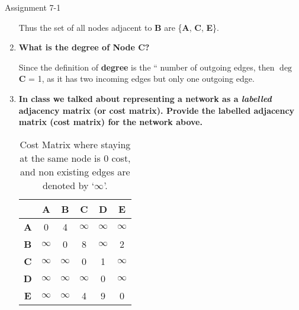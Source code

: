\documentclass{beamer}
\begin{document}
\begin{frame}[allowframebreaks]{Assignment 7-1}
\begin{enumerate}
\begin{solution}
			Thus the set of all nodes adjacent to \textbf{B} are \{\textbf{A}, \textbf{C}, \textbf{E}\}.
		\end{solution}
		\item {\bf What is the degree of Node C?}
		\begin{solution}
			Since the definition of \textbf{degree} is the `` number of outgoing edges, then $\deg$ \textbf{C} = 1, as it has two incoming edges but only one outgoing edge.
		\end{solution}
		\item {\bf In class we talked about representing a network as a \emph{labelled} adjacency matrix (or cost matrix). Provide the labelled adjacency matrix (cost matrix) for the network above.}
		\begin{solution}
		\begin{table}
			\centering
				\begin{tabular}{c|ccccc}
				& \textbf{A} & \textbf{B} & \textbf{C} & \textbf{D}& \textbf{E}\\
				\hline
				\textbf{A} & 0 &4 &$\infty$ &$\infty$ &$\infty$ \\
				\textbf{B} &  $\infty$& 0&8 &$\infty$ & 2\\
				\textbf{C} &$\infty$  &$\infty$ & 0& 1& $\infty$\\
				\textbf{D} &$\infty$  &$\infty$ & $\infty$&0& $\infty$\\
				\textbf{E} &$\infty$  &$\infty$ &4 & 9& 0\\
			\end{tabular}
			\label{tab:costmat}
			\caption{Cost Matrix where staying at the same node is 0 cost, and non existing edges are denoted by `$\infty$'. }
		\end{table}
		\end{solution}
	\end{enumerate}
\end{frame}
\end{document}
